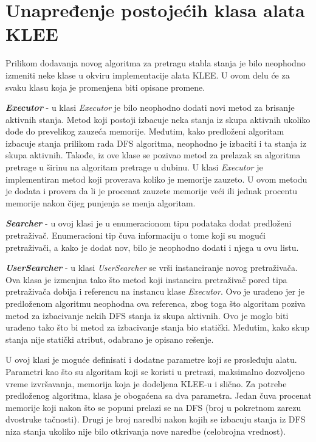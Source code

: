 \documentclass[12pt,oneside]{memoir}
\begin{document}
\section{Unapređenje postojećih klasa alata KLEE} \label{izmene}
Prilikom dodavanja novog algoritma za pretragu stabla stanja je bilo neophodno izmeniti neke klase u okviru implementacije alata KLEE. U ovom delu će za svaku klasu koja je promenjena biti opisane promene.

\begin{description}
    \item \textbf{\textit{Executor}} - u klasi \textit{Executor} je bilo neophodno dodati novi metod za brisanje aktivnih stanja. Metod koji postoji izbacuje neka stanja iz skupa aktivnih ukoliko dođe do prevelikog zauzeća memorije. Međutim, kako predloženi algoritam izbacuje stanja prilikom rada DFS algoritma, neophodno je izbaciti i ta stanja iz skupa aktivnih. Takođe, iz ove klase se pozivao metod za prelazak sa algoritma pretrage u širinu na algoritam pretrage u dubinu. U klasi \textit{Executor} je implementiran metod koji proverava koliko je memorije zauzeto. U ovom metodu je dodata i provera da li je procenat zauzete memorije veći ili jednak procentu memorije nakon čijeg punjenja se menja algoritam.
    
    \item \textbf{\textit{Searcher}} - u ovoj klasi je u enumeracionom tipu podataka dodat predloženi pretraživač. Enumeracioni tip čuva informaciju o tome koji su mogući pretraživači, a kako je dodat nov, bilo je neophodno dodati i njega u ovu listu.
    
    \item \textbf{\textit{UserSearcher}} \label{userSearcher} - u klasi \textit{UserSearcher} se vrši instanciranje novog pretraživača. Ova klasa je izmenjna tako što metod koji instancira pretraživač pored tipa pretraživača dobija i referencu na instancu klase \textit{Executor}. Ovo je urađeno jer je predloženom algoritmu neophodna ova referenca, zbog toga što algoritam poziva metod za izbacivanje nekih DFS stanja iz skupa aktivnih. Ovo je moglo biti urađeno tako što bi metod za izbacivanje stanja bio statički. Međutim, kako skup stanja nije statički atribut, odabrano je opisano rešenje. 
    
    U ovoj klasi je moguće definisati i dodatne parametre koji se prosleđuju alatu. Parametri kao što su algoritam koji se koristi u pretrazi, maksimalno dozvoljeno vreme izvršavanja, memorija koja je dodeljena KLEE-u i slično. Za potrebe predloženog algoritma, klasa je obogaćena sa dva parametra. Jedan čuva procenat memorije koji nakon što se popuni prelazi se na DFS (broj u pokretnom zarezu dvostruke tačnosti). Drugi je broj naredbi nakon kojih se izbacuju stanja iz DFS niza stanja ukoliko nije bilo otkrivanja nove naredbe (celobrojna vrednost).
\end{description}
\end{document}

